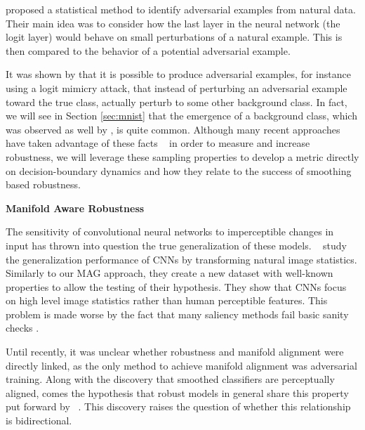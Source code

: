 \citet{roth19aodds} proposed a statistical method to identify adversarial examples from natural data. Their main idea was to consider how the last layer in the neural network (the logit layer) would behave on small perturbations of a natural example. %
This is then compared to the behavior of a potential adversarial example. 

It was shown by \citet{hosseini2019odds} that it is possible to produce adversarial examples, for instance using a logit mimicry attack, that instead of perturbing an adversarial example toward the true class, actually perturb to some other background class. In fact, we will see in Section \ref{sec:mnist} that the emergence of a background class, which was observed as well by \citet{roth19aodds}, is quite common. Although many recent approaches have taken advantage of these facts ~\citep{taori2020shifts, lu2022randommasking, Osada_2023_WACV, blau2023classifier} in order to measure and increase robustness, we will leverage these sampling properties to develop a metric directly on decision-boundary dynamics and how they relate to the success of smoothing based robustness. 

{\bf Manifold Aware Robustness}

The sensitivity of convolutional neural networks to imperceptible changes in input has thrown into question the true generalization of these models.
~\citet{jo2017measuring} study the generalization performance of CNNs by transforming natural image statistics.  %
Similarly to our MAG approach, they create a new dataset with well-known properties to allow the testing of their hypothesis.
They show that CNNs focus on high level image statistics rather than human perceptible features.
This problem is made worse by the fact that many saliency methods fail basic sanity checks \citep{adebayo2018sanity, kindermans2019reliability}.

Until recently, it was unclear whether robustness and manifold alignment were directly linked, as the only method to achieve manifold alignment was adversarial training.
Along with the discovery that smoothed classifiers are perceptually
aligned, comes the hypothesis that robust models in general share this
property put forward by ~\citet{kaur2019perceptually}.
This discovery raises the question of whether this relationship is bidirectional.

